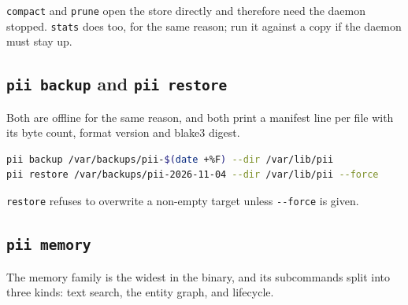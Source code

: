 \texttt{compact} and \texttt{prune} open the store directly and therefore need the daemon
stopped. \texttt{stats} does too, for the same reason; run it against a copy if the daemon
must stay up.

\subsection*{\texttt{pii backup} and \texttt{pii restore}}

Both are offline for the same reason, and both print a manifest line per file with its byte
count, format version and blake3 digest.

\begin{lstlisting}[language=bash]
pii backup /var/backups/pii-$(date +%F) --dir /var/lib/pii
pii restore /var/backups/pii-2026-11-04 --dir /var/lib/pii --force
\end{lstlisting}

\texttt{restore} refuses to overwrite a non-empty target unless \texttt{-{}-force} is given.

\subsection*{\texttt{pii memory}}

The memory family is the widest in the binary, and its subcommands split into three kinds:
text search, the entity graph, and lifecycle.

